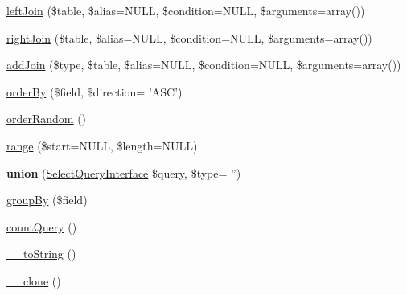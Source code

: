 \begin{DoxyCompactItemize}
\hyperlink{classSelectQuery_ab542a3bf62cfab85c8a4e0c3ac093d11}{leftJoin} (\$table, \$alias=NULL, \$condition=NULL, \$arguments=array())
\item 
\hyperlink{classSelectQuery_a0b3a40164be944401296be9e9ab1c23c}{rightJoin} (\$table, \$alias=NULL, \$condition=NULL, \$arguments=array())
\item 
\hyperlink{classSelectQuery_ad4a44826400c0a880129e009cbdea2d2}{addJoin} (\$type, \$table, \$alias=NULL, \$condition=NULL, \$arguments=array())
\item 
\hyperlink{classSelectQuery_a32ede93f2abfd7f8bc388d0c00512fae}{orderBy} (\$field, \$direction= 'ASC')
\item 
\hyperlink{classSelectQuery_af284bacf9e56ccf177d17f4b4bc84b03}{orderRandom} ()
\item 
\hyperlink{classSelectQuery_a11a242cc59d1e2dee26848d5ab8de236}{range} (\$start=NULL, \$length=NULL)
\item 
\hypertarget{classSelectQuery_a50ad7154a213894e740adcbafe333d08}{
{\bfseries union} (\hyperlink{interfaceSelectQueryInterface}{SelectQueryInterface} \$query, \$type= '')}
\label{classSelectQuery_a50ad7154a213894e740adcbafe333d08}

\item 
\hyperlink{classSelectQuery_aadcd66d052ac3e3f1fc2eb1490cdade7}{groupBy} (\$field)
\item 
\hyperlink{classSelectQuery_a7d2e665bede18c709f677033e04db55e}{countQuery} ()
\item 
\hyperlink{classSelectQuery_ae5b1bbcecaf13957de15eb49584195b3}{\_\-\_\-toString} ()
\item 
\hyperlink{classSelectQuery_a4a73a8d52451d193b53192e478a88161}{\_\-\_\-clone} ()
\end{DoxyCompactItemize}
